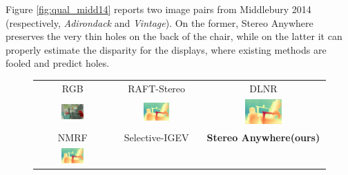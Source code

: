 \documentclass[10pt,twocolumn,letterpaper]{article}
\newcommand{\method}[0]{Stereo Anywhere\xspace}
\begin{document}
\clearpage

Figure \ref{fig:qual_midd14} reports two image pairs from Middlebury 2014 (respectively, \textit{Adirondack} and \textit{Vintage}). On the former, \method preserves the very thin holes on the back of the chair, while on the latter it can properly estimate the disparity for the displays, where existing methods are fooled and predict holes.

\begin{figure}[h]
    \centering
    \renewcommand{\tabcolsep}{1pt}
    \begin{tabular}{ccc}
        \small RGB &
        \small RAFT-Stereo \cite{lipson2021raft} &
        \small DLNR \cite{zhao2023high} \\
        \includegraphics[width=0.32\textwidth]{imgs/middlebury/rgb/0.jpg} &
        \includegraphics[width=0.32\textwidth]{imgs/middlebury/stereo/RAFT-Stereo/0.jpg} &
        \includegraphics[width=0.32\textwidth]{imgs/middlebury/stereo/DLNR/0.jpg} \\
        \small NMRF \cite{guan2024neural} &
        \small Selective-IGEV \cite{wang2024selective} &
        \textbf{\method (ours)} \\
        \includegraphics[width=0.32\textwidth]{imgs/middlebury/stereo/NMRF/0.jpg} &

\end{tabular}
\end{figure}
\end{document}
